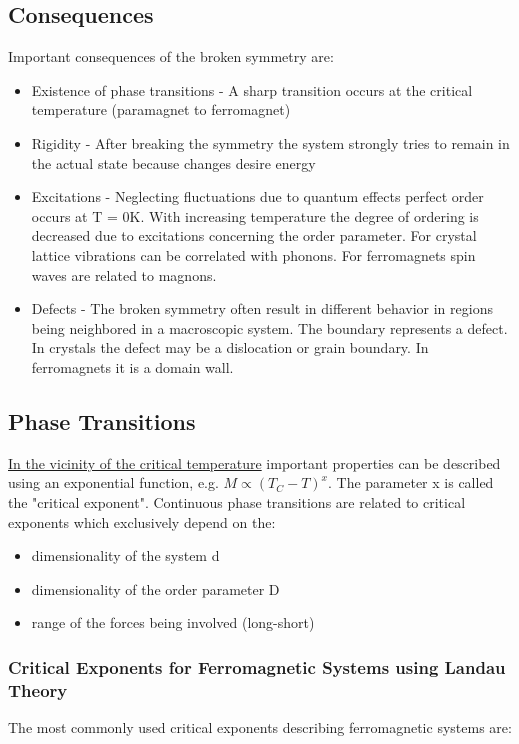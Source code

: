 \documentclass[10pt]{article} %
\begin{document}
\subsection{Consequences}
Important consequences of the broken symmetry are:

\begin{itemize}
\item Existence of phase transitions - A sharp transition occurs at the critical temperature (paramagnet to ferromagnet)
\item Rigidity - After breaking the symmetry the system strongly tries to remain in the actual state because changes desire energy
\item Excitations - Neglecting fluctuations due to quantum effects perfect order occurs at T = 0K. With increasing temperature the degree of ordering is decreased due to excitations concerning the order parameter. For crystal lattice vibrations can be correlated with phonons. For ferromagnets spin waves are related to magnons.
\item Defects - The broken symmetry often result in different behavior in regions being neighbored in a macroscopic system. The boundary represents a defect. In crystals the defect may be a dislocation or grain boundary. In ferromagnets it is a domain wall.
\end{itemize}

\subsection{Phase Transitions}
\underline{In the vicinity of the critical temperature} important properties can be described using an exponential function, e.g. $M \propto (T_C - T)^x$. The parameter x is called the "critical exponent". Continuous phase transitions are related to critical exponents which exclusively depend on the:

\begin{itemize}
\item dimensionality of the system d
\item dimensionality of the order parameter D
\item range of the forces being involved (long-short)
\end{itemize}

\subsubsection{Critical Exponents for Ferromagnetic Systems using Landau Theory}
The most commonly used critical exponents describing ferromagnetic systems are:
\end{document}
